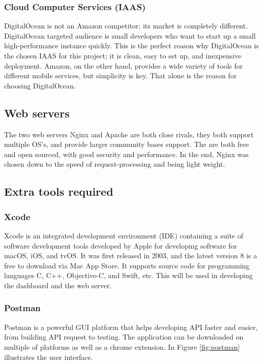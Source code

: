 \subsubsection{Cloud Computer Services (IAAS)}
DigitalOcean is not an Amazon competitor; its market is completely different. DigitalOcean targeted audience is small developers who want to start up a small high-performance instance \cite{iaas} quickly. This is the perfect reason why DigitalOcean is the chosen IAAS for this project; it is clean, easy to set up, and inexpensive deployment. Amazon, on the other hand, provides a wide variety of tools for different mobile services, but simplicity is key. That alone is the reason for choosing DigitalOcean.

\subsection{Web servers}
The two web servers Nginx and Apache are both close rivals, they both support multiple OS's, and provide larger community bases support. The are both free and open sourced, with good security and performance. In the end, Nginx was chosen down to the speed of request-processing and being light weight. \cite{server_choice}

\subsection{Extra tools required}

\subsubsection{Xcode}

Xcode \cite{xcode} is an integrated development environment (IDE) containing a suite of software development tools developed by Apple for developing software for macOS, iOS, and tvOS. It was first released in 2003, and the latest version 8 is a free to download via Mac App Store. It supports source code for programming languages C, C++, Objective-C, and Swift, etc. This will be used in developing the dashboard and the web server.

\subsubsection{Postman}

Postman \cite{postman} is a powerful GUI platform that helps developing API faster and easier, from building API request to testing. The application can be downloaded on multiple of platforms as well as a chrome extension. In Figure \ref{fig:postman} illustrates the user interface. 

